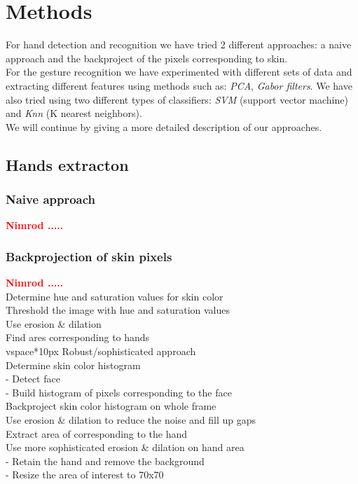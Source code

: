 \documentclass[a4paper, 11pt, twocolumn]{article}
\newcommand{\todo}[1]{\textcolor{red}{\textbf{#1}}}
\begin{document}
    \section{Methods}
	\label{sec:methods}
		For hand detection and recognition we have tried 2 different approaches: a naive approach and the backproject of the pixels corresponding to skin.\\
		\hspace*{10px}For the gesture recognition we have experimented with different sets of data and extracting different features using methods such as: \emph{PCA}, \emph{Gabor filters}. We have also tried using two different types of classifiers: \emph{SVM} (support vector machine) and \emph{Knn} (K nearest neighbors).\\
		\hspace*{10px}We will continue by giving a more detailed description of our approaches. 
        \subsection{Hands extracton}
		\label{sec:Meth_exrctHands}
        \subsubsection{Naive approach}
		\todo{Nimrod .....}\\

        \subsubsection{Backprojection of skin pixels}
        \todo{Nimrod .....}\\
        Determine hue and saturation values for skin color\\
        Threshold the image with hue and saturation values\\
        Use erosion \& dilation\\
        Find ares corresponding to hands\\
        vspace*{10px}
        Robust/sophisticated approach\\
        Determine skin color histogram\\
        - Detect face\\
        - Build histogram of pixels corresponding to the face\\
        Backproject skin color histogram on whole frame\\
        Use erosion \& dilation to reduce the noise and fill up gaps\\
        Extract area of corresponding to the hand\\
        Use more sophisticated erosion \& dilation on hand area\\
        - Retain the hand and remove the background\\
        - Resize the area of interest to 70x70
\end{document}
